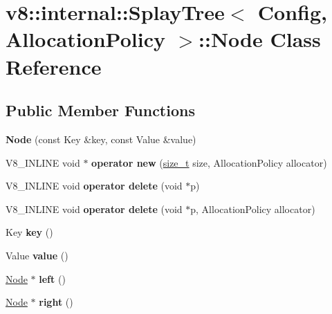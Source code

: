 \hypertarget{classv8_1_1internal_1_1SplayTree_1_1Node}{}\section{v8\+:\+:internal\+:\+:Splay\+Tree$<$ Config, Allocation\+Policy $>$\+:\+:Node Class Reference}
\label{classv8_1_1internal_1_1SplayTree_1_1Node}
\subsection*{Public Member Functions}
\begin{DoxyCompactItemize}
\item 
\mbox{\label{classv8_1_1internal_1_1SplayTree_1_1Node_afbf36c9ccaf941f68622801a7533d0d0}} 
{\bfseries Node} (const Key \&key, const Value \&value)
\item 
\mbox{\label{classv8_1_1internal_1_1SplayTree_1_1Node_ae290e0c84bde5f6a32ba2d6192a88fca}} 
V8\+\_\+\+I\+N\+L\+I\+NE void $\ast$ {\bfseries operator new} (\mbox{\hyperlink{classsize__t}{size\+\_\+t}} size, Allocation\+Policy allocator)
\item 
\mbox{\label{classv8_1_1internal_1_1SplayTree_1_1Node_a8885e8c2516f9a46dfd2901b2783b961}} 
V8\+\_\+\+I\+N\+L\+I\+NE void {\bfseries operator delete} (void $\ast$p)
\item 
\mbox{\label{classv8_1_1internal_1_1SplayTree_1_1Node_a10da8da206afe972e56d05e85f47eaa3}} 
V8\+\_\+\+I\+N\+L\+I\+NE void {\bfseries operator delete} (void $\ast$p, Allocation\+Policy allocator)
\item 
\mbox{\label{classv8_1_1internal_1_1SplayTree_1_1Node_a7ae7043f1ada5717bdfb33f2397ae750}} 
Key {\bfseries key} ()
\item 
\mbox{\label{classv8_1_1internal_1_1SplayTree_1_1Node_ad59061dcf7804af21eaf46c293ba6fe9}} 
Value {\bfseries value} ()
\item 
\mbox{\label{classv8_1_1internal_1_1SplayTree_1_1Node_a7c52ec777cb6f8e30e1b40429cd8dc12}} 
\mbox{\hyperlink{classv8_1_1internal_1_1SplayTree_1_1Node}{Node}} $\ast$ {\bfseries left} ()
\item 
\mbox{\label{classv8_1_1internal_1_1SplayTree_1_1Node_a4fa249e21bb6d3d170b34bbd4180e36a}} 
\mbox{\hyperlink{classv8_1_1internal_1_1SplayTree_1_1Node}{Node}} $\ast$ {\bfseries right} ()
\end{DoxyCompactItemize}
